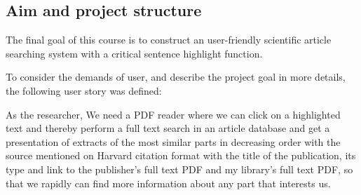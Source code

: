 \subsection{Aim and project structure}
	The final goal of this course is to construct an user-friendly scientific article searching system with a critical sentence highlight function.
	
	To consider the demands of user, and describe the project goal in more details, the following user story was defined:
	
	As the researcher, We need a PDF reader where we can click on a highlighted text and thereby perform a full text search in an article database and get a presentation of extracts of the most similar parts in decreasing order with the source mentioned on Harvard citation format with the title of the publication, its type and link to the publisher’s full text PDF and my library’s full text PDF, so that we rapidly can find more information about any part that interests us.